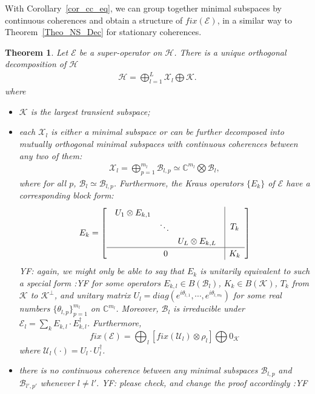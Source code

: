 \documentclass[journal]{IEEEtran}
\def\h{\ensuremath{\mathcal{H}}}
\def\u{\ensuremath{\mathcal{U}}}
\def\k{\ensuremath{\mathcal{K}}}
\def\u{\ensuremath{\mathcal{U}}}
\def\x{\ensuremath{\mathcal{X}}}
\def\b{\ensuremath{\mathcal{B}}}
\def\e{\ensuremath{\mathcal{E}}}
\def\k{\mathcal{K}}
\newtheorem{theorem}{Theorem}
\newcommand{\authorComment}[3]{\color{#1}#2: {#3} :#2\color{black}}
\newcommand{\yf}[1]{\authorComment{blue}{YF}{#1}}
\begin{document}
With Corollary~\ref{cor_cc_eq}, we can group together minimal subspaces by continuous coherences and obtain a structure of $fix(\e)$, in a similar way to Theorem~\ref{Theo_NS_Dec} for stationary coherences. 

\begin{theorem}\label{Theo_CC_dec}
  Let $\e$ be a super-operator on $\h$. There is a unique  orthogonal decomposition of $\h$
  \begin{eqnarray}\label{Eq_unique}
    \h=\bigoplus_{l=1}^{L}\x_l\bigoplus \k.
  \end{eqnarray}
  where \begin{itemize}
    \item[(1)] $\k$ is the largest transient subspace;
    \item[(2)] each $\x_l$ is either a minimal subspace or can be further decomposed into mutually orthogonal minimal subspaces with continuous coherences between any two of them:
    \begin{eqnarray}\label{Eq_dec_CC}
      \x_l=\bigoplus_{p=1}^{m_l}\b_{l,p}\simeq\mathbb{C}^{m_l}\bigotimes \b_l, 
    \end{eqnarray} 
   where for all $p$, $\b_l\simeq \b_{l,p}$. Furthermore, the Kraus operators $\{E_k\}$ of $\e$ have a corresponding block form:
      \begin{eqnarray}\label{Eq_CC_dec_Kraus}
    \renewcommand{\arraystretch}{1.2}
E_k=\left[\begin{array}{c|c}
  \begin{array}{ccc}
  U_{1}\otimes E_{k,1} &  &\\
   & \ddots &\\
   & & U_{L}\otimes E_{k,L}  
  \end{array} & T_k\\
  \hline
0&K_k
\end{array}\right]
  \end{eqnarray}
  \yf{again, we might only be able to say that $E_k$ is unitarily equivalent to such a special form}
for some operators $E_{k,l}\in B(\b_l)$, $K_k\in B(\k)$, $T_k$ from $\k$ to $\k^\perp$, and    unitary matrix $U_l=diag(e^{i\theta_{l,1}},\cdots,e^{i\theta_{l,m_l}})$ for some real numbers $\{\theta_{l,p}\}_{p=1}^{m_l}$ on $\mathbb{C}^{m_l}$. Moreover, $\b_l$ is irreducible under $\e_{l}=\sum_{k}E_{k,l}\cdot E_{k,l}^\dagger$. 
 Furthermore, 
$$fix(\e)=\bigoplus_l[fix(\u_{l})\otimes \rho_l]\bigoplus 0_\k$$ 
where $\u_l(\cdot)=U_l\cdot U_l^\dagger$. 

    \item[(3)] there is no continuous coherence between any minimal subspaces $\b_{l, p}$ and $\b_{l', p'}$ whenever $l\neq l'.$  \yf{please check, and change the proof accordingly}
      \end{itemize}
\end{theorem}
\end{document}
